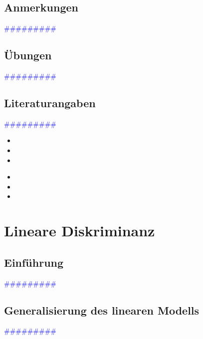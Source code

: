 \documentclass{article}
\begin{document}
  \subsection{Anmerkungen} %
      \textcolor{blue}{\#\#\#\#\#\#\#\#\#}
  \subsection{Übungen} %
      \textcolor{blue}{\#\#\#\#\#\#\#\#\#}
  \subsection{Literaturangaben} %
      \textcolor{blue}{\#\#\#\#\#\#\#\#\#}

      \begin{itemize}
      \color{red}
        \item 
        \item
        \item
      \end{itemize}


      \begin{itemize}
      \color{ForestGreen}
        \item 
        \item
        \item
      \end{itemize}




\newpage
\section{Lineare Diskriminanz} %
  \subsection{Einführung} %
      \textcolor{blue}{\#\#\#\#\#\#\#\#\#}
  \subsection{Generalisierung des linearen Modells} %
      \textcolor{blue}{\#\#\#\#\#\#\#\#\#}
\end{document}
